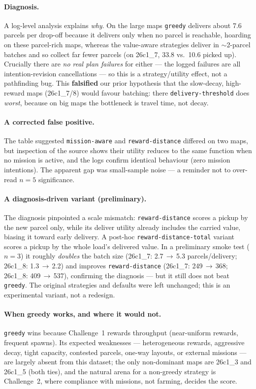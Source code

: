 \paragraph{Diagnosis.} A log-level analysis explains \emph{why}. On the large
maps \texttt{greedy} delivers about 7.6 parcels per drop-off because it delivers
only when no parcel is reachable, hoarding on these parcel-rich maps, whereas
the value-aware strategies deliver in $\sim$2-parcel batches and so collect far
fewer parcels (on 26c1\_7, 33.8 vs.\ 10.6 picked up). Crucially there are
\emph{no real plan failures} for either --- the logged failures are all
intention-revision cancellations --- so this is a strategy/utility effect, not
a pathfinding bug. This \textbf{falsified} our prior hypothesis that the
slow-decay, high-reward maps (26c1\_7/8) would favour batching: there
\texttt{delivery-threshold} does \emph{worst}, because on big maps the
bottleneck is travel time, not decay.

\paragraph{A corrected false positive.} The table suggested \texttt{mission-aware}
and \texttt{reward-distance} differed on two maps, but inspection of the source
shows their utility reduces to the same function when no mission is active, and
the logs confirm identical behaviour (zero mission intentions). The apparent
gap was small-sample noise --- a reminder not to over-read $n{=}5$
significance.

\paragraph{A diagnosis-driven variant (preliminary).} The diagnosis pinpointed
a scale mismatch: \texttt{reward-distance} scores a pickup by the new parcel
only, while its deliver utility already includes the carried value, biasing it
toward early delivery. A post-hoc \texttt{reward-distance-total} variant scores
a pickup by the whole load's delivered value. In a preliminary smoke test
($n{=}3$) it roughly \emph{doubles} the batch size (26c1\_7: 2.7\,$\to$\,5.3
parcels/delivery; 26c1\_8: 1.3\,$\to$\,2.2) and improves \texttt{reward-distance}
(26c1\_7: 249\,$\to$\,368; 26c1\_8: 409\,$\to$\,537), confirming the diagnosis
--- but it still does not beat \texttt{greedy}. The original strategies and
defaults were left unchanged; this is an experimental variant, not a redesign.

\paragraph{When greedy works, and where it would not.} \texttt{greedy} wins
because Challenge~1 rewards throughput (near-uniform rewards, frequent spawns).
Its expected weaknesses --- heterogeneous rewards, aggressive decay, tight
capacity, contested parcels, one-way layouts, or external missions --- are
largely absent from this dataset; the only non-dominant maps are 26c1\_3 and
26c1\_5 (both ties), and the natural arena for a non-greedy strategy is
Challenge~2, where compliance with missions, not farming, decides the score.

